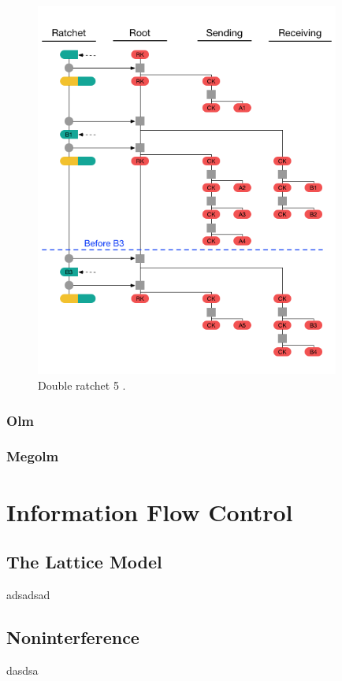 \begin{figure}[H]
	\centering
	\includegraphics[width=10cm]{figures/doubleratchet5.png}
	\caption{Double ratchet 5 \cite{doubleratchet}.}
	\label{fig:doubleratchet5}
\end{figure}


\subsubsection{Olm}

\subsubsection{Megolm}


\newpage
\section{Information Flow Control} %

\subsection{The Lattice Model}
adsadsad

\subsection{Noninterference}
dasdsa

